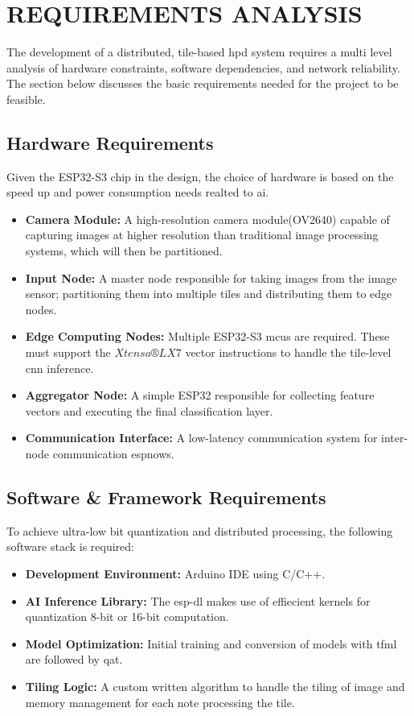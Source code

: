 \chapter{REQUIREMENTS ANALYSIS}
\label{chap:requirements}

The development of a distributed, tile-based \gls{hpd} system requires a multi level analysis of hardware constraints, software dependencies, and network reliability. The section below discusses the basic requirements needed for the project to be feasible.
\section{Hardware Requirements}
Given the ESP32-S3 chip in the design, the choice of hardware is based on the speed up and power consumption needs realted to \gls{ai}.

\begin{itemize}
    \item \textbf{Camera Module:} A high-resolution camera module(OV2640) capable of capturing images at higher resolution than traditional image processing systems, which will then be partitioned.
    \item \textbf{Input Node:} A master node responsible for taking images from the image sensor; partitioning them into multiple tiles and distributing them to edge nodes.
    \item \textbf{Edge Computing Nodes:} Multiple ESP32-S3 \glspl{mcu} are required. These must support the $Xtensa® LX7$ vector instructions to handle the tile-level \gls{cnn} inference.
    \item \textbf{Aggregator Node:} A  simple ESP32 responsible for collecting feature vectors and executing the final classification layer.
    \item \textbf{Communication Interface:} A low-latency communication system for inter-node communication \glspl{espnow}.
\end{itemize}

\section{Software \& Framework Requirements}
To achieve ultra-low bit quantization and distributed processing, the following software stack is required:

\begin{itemize}
    \item \textbf{Development Environment:} Arduino IDE using C/C++.
    
    \item \textbf{AI Inference Library:} The \gls{esp-dl} makes use of effiecient kernels for quantization 8-bit or 16-bit computation.

    \item \textbf{Model Optimization:} Initial training and conversion of models with \gls{tfml} are followed by \gls{qat}.
    
    \item \textbf{Tiling Logic:} A custom written algorithm to handle the tiling of image and memory management for each note processing the tile.
\end{itemize}


